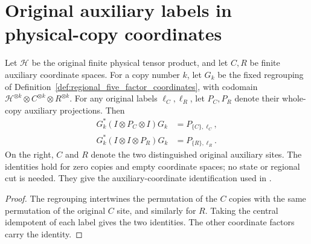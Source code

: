 \section{Original auxiliary labels in physical-copy coordinates}
\label{sec:regional_auxiliary_labels}

\begin{theorem}
\label{thm:global_replica_auxiliary_labels}
\leanok
Let $\mathcal H$ be the original finite physical tensor product, and let
$C,R$ be finite auxiliary coordinate spaces. For a copy number $k$, let
$G_k$ be the fixed regrouping of
Definition~\ref{def:regional_five_factor_coordinates}, with codomain
$\mathcal H^{\otimes k}\otimes C^{\otimes k}\otimes R^{\otimes k}$.
For any original labels $\ell_C,\ell_R$, let $P_C,P_R$ denote their
whole-copy auxiliary projections. Then
\begin{align}
 G_k^*(I\otimes P_C\otimes I)G_k&=P_{\{C\},\ell_C},\\
 G_k^*(I\otimes I\otimes P_R)G_k&=P_{\{R\},\ell_R}.
\end{align}
On the right, $C$ and $R$ denote the two distinguished original auxiliary
sites. The identities hold for zero copies and empty coordinate spaces;
no state or regional cut is needed. They give the auxiliary-coordinate
identification used in
\cite[Section~8, lines~421--443]{OpenAI2026AreaLaw}.
\end{theorem}
\begin{proof}
\leanok
{}
The regrouping intertwines the permutation of the $C$ copies with the
same permutation of the original $C$ site, and similarly for $R$.
Taking the central idempotent of each label gives the two identities.
The other coordinate factors carry the identity.
\end{proof}
